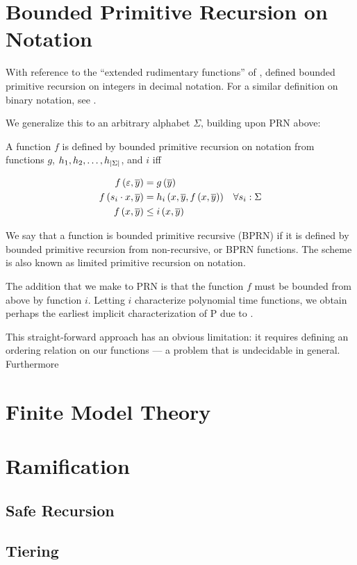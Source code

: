 \section{Bounded Primitive Recursion on Notation}

With reference to the ``extended rudimentary functions'' of
\cite{bennett-1962}, \cite{cobham-1965} defined bounded primitive recursion on
integers in decimal notation. For a similar definition on binary notation, see
\cite[p.  127]{rose-1984}.

We generalize this to an arbitrary alphabet $\Sigma$, building upon PRN above:

\begin{definition}

A function $f$ is defined by bounded primitive recursion on notation from
functions $g$, $h_1,h_2,\ldots,h_{\left|{\Sigma}\right|}$, and $i$ iff

\begin{align}
f\left({\varepsilon, \overline{y}}\right)  &= g\left({\overline{y}}\right) \\
f\left({s_i \cdot x,\overline{y}}\right) &= h_i\left({x,\overline{y},f\left({x,\overline{y}}\right)}\right) & \forall s_i : \Sigma \\
f\left({x,\overline{y}}\right) &\leq i\left({x,\overline{y}}\right)\label{def-brn-poly-bound}
\end{align}

\end{definition}

We say that a function is bounded primitive recursive (BPRN) if it is defined
by bounded primitive recursion from non-recursive, or BPRN functions. The
scheme is also known as limited primitive recursion on notation.

The addition that we make to PRN is that the function $f$ must be bounded from
above by function $i$. Letting $i$ characterize polynomial time functions, we
obtain perhaps the earliest implicit characterization of P due to
\cite{cobham-1965}.

This straight-forward approach has an obvious limitation: it requires defining
an ordering relation on our functions --- a problem that is undecidable in
general. Furthermore 

\section{Finite Model Theory}

\section{Ramification}

\subsection{Safe Recursion}

\subsection{Tiering}
